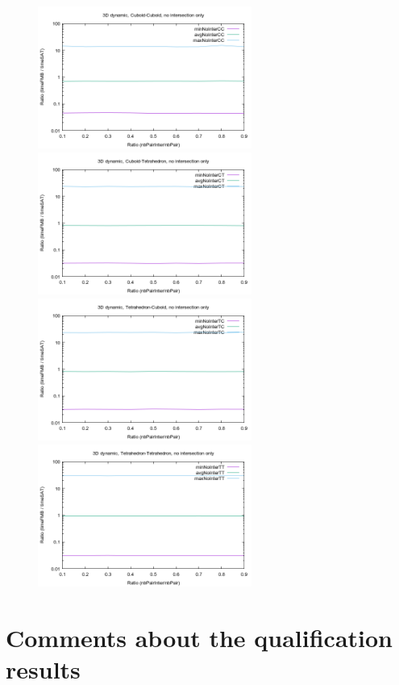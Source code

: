 \documentclass[12pt, a4paper]{article}
\begin{document}
\begin{center}
\begin{figure}[H]
\centering\includegraphics[width=7cm]{../Results/qualification3DTimeCCnointer.png}
\centering\includegraphics[width=7cm]{../Results/qualification3DTimeCTnointer.png}
\centering\includegraphics[width=7cm]{../Results/qualification3DTimeTCnointer.png}
\centering\includegraphics[width=7cm]{../Results/qualification3DTimeTTnointer.png}
\end{figure}
\end{center}

\section{Comments about the qualification results}
\end{document}

